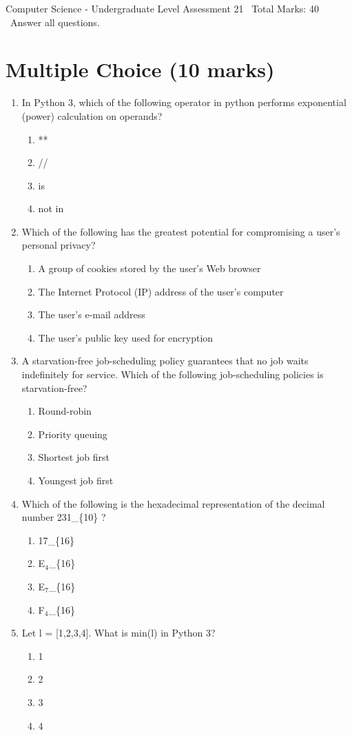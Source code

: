 \documentclass[12pt]{article}
\begin{document}
\begin{center}
Computer Science - Undergraduate Level Assessment 21 \
Total Marks: 40 \
Answer all questions.
\end{center}

\section*{Multiple Choice (10 marks)}
\begin{enumerate}[label=\arabic*.]
\item In Python 3, which of the following operator in python performs exponential (power) calculation on operands?
\begin{enumerate}[label=(\alph*)]
    \item **
    \item //
    \item is
    \item not in
\end{enumerate}
\item Which of the following has the greatest potential for compromising a user's personal privacy?
\begin{enumerate}[label=(\alph*)]
    \item A group of cookies stored by the user's Web browser
    \item The Internet Protocol (IP) address of the user's computer
    \item The user's e-mail address
    \item The user's public key used for encryption
\end{enumerate}
\item A starvation-free job-scheduling policy guarantees that no job waits indefinitely for service. Which of the following job-scheduling policies is starvation-free?
\begin{enumerate}[label=(\alph*)]
    \item Round-robin
    \item Priority queuing
    \item Shortest job first
    \item Youngest job first
\end{enumerate}
\item Which of the following is the hexadecimal representation of the decimal number 231\_\{10\} ?
\begin{enumerate}[label=(\alph*)]
    \item 17\_\{16\}
    \item E$_{4}$\_\{16\}
    \item E$_{7}$\_\{16\}
    \item F$_{4}$\_\{16\}
\end{enumerate}
\item Let l = [1,2,3,4]. What is min(l) in Python 3?
\begin{enumerate}[label=(\alph*)]
    \item 1
    \item 2
    \item 3
    \item 4
\end{enumerate}
\end{enumerate}
\end{document}
